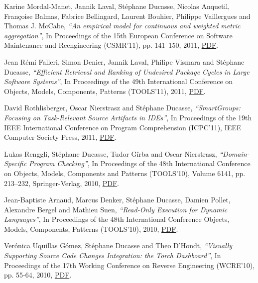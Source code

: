 \documentclass{article}
\newcommand{\czauthors}[1]{#1}
\newcommand{\cztitle}[1]{\emph{``#1''}}
\newcommand{\czbooktitle}[1]{#1}
\begin{document}
\begin{itemize}
	\pub  \czauthors{Karine Mordal-Manet, Jannik Laval, St\'ephane Ducasse, Nicolas Anquetil, Fran\c{c}oise Balmas, Fabrice Bellingard, Laurent Bouhier, Philippe Vaillergues and Thomas J. McCabe},  \cztitle{An empirical model for continuous and weighted metric aggregation},  In \czbooktitle{Proceedings of the 15th European Conference on Software Maintenance and Reengineering (CSMR'11)}, pp. 141--150, 2011, \href{http://rmod-files.lille.inria.fr/Team/Texts/Papers/Mord11a-CSMR2011-Squale.pdf}{PDF}.

	\pub  \czauthors{Jean R\'emi Falleri, Simon Denier, Jannik Laval, Philipe Vismara and St\'ephane Ducasse},  \cztitle{Efficient Retrieval and Ranking of Undesired Package Cycles in Large Software Systems},  In \czbooktitle{Proceedings of the 49th International Conference on Objects, Models, Components, Patterns (TOOLS'11)}, 2011, \href{http://rmod-files.lille.inria.fr/Team/Texts/Papers/Fall11a-Tools2011-UndesirableCycles.pdf}{PDF}.

	\pub  \czauthors{David Rothlisberger, Oscar Nierstrasz and St\'ephane Ducasse},  \cztitle{SmartGroups: Focusing on Task-Relevant Source Artifacts in IDEs},  In \czbooktitle{Proceedings of the 19th IEEE International Conference on Program Comprehension (ICPC'11)}, IEEE Computer Society Press, 2011, \href{http://rmod-files.lille.inria.fr/Team/Texts/Papers/Roet11a-ICPC2011-smartGroups.pdf}{PDF}.

	\pub  \czauthors{Lukas Renggli, St\'ephane Ducasse, Tudor G\^irba and Oscar Nierstrasz},  \cztitle{Domain-Specific Program Checking},  In \czbooktitle{Proceedings of the 48th International Conference on Objects, Models, Components and Patterns (TOOLS'10)}, Volume 6141, pp. 213--232, Springer-Verlag, 2010, \href{http://rmod-files.lille.inria.fr/Team/Texts/Papers/Reng10b-DomainSpecificProgramChecking.pdf}{PDF}.

	\pub  \czauthors{Jean-Baptiste Arnaud, Marcus Denker, St\'ephane Ducasse, Damien Pollet, Alexandre Bergel and Mathieu Suen},  \cztitle{Read-Only Execution for Dynamic Languages},  In \czbooktitle{Proceedings of the 48th International Conference Objects, Models, Components, Patterns (TOOLS'10)}, 2010, \href{http://rmod-files.lille.inria.fr/Team/Texts/Papers/Arna10a-Tools2010-ReadOnlyExecutionForDynamicLanguages.pdf}{PDF}.

	\pub  \czauthors{Ver\'onica Uquillas G\'omez, St\'ephane Ducasse and Theo D'Hondt},  \cztitle{Visually Supporting Source Code Changes Integration: the {T}orch Dashboard},  In \czbooktitle{Proceedings of the 17th Working Conference on Reverse Engineering (WCRE'10)}, pp. 55-64, 2010, \href{http://rmod-files.lille.inria.fr/Team/Texts/Papers/Uqui10a-Torch-WCRE10.pdf}{PDF}.


\end{itemize}
\end{document}
